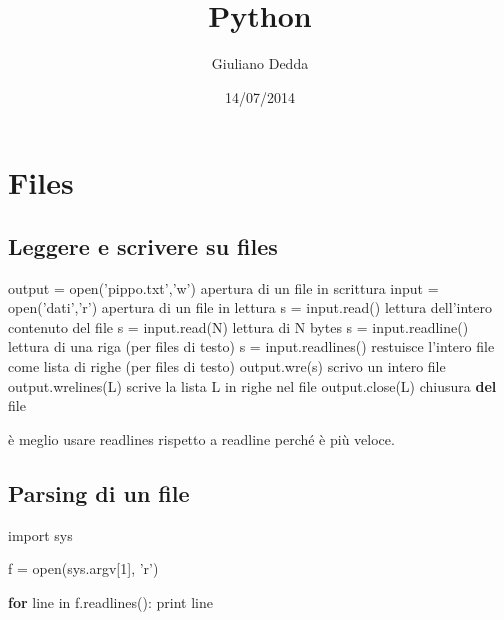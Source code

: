 \documentclass[]{article}
\title{Python}
\author{Giuliano Dedda}
\date{14/07/2014}
\newenvironment{Shaded}{}{}
\newcommand{\KeywordTok}[1]{\textcolor[rgb]{0.00,0.44,0.13}{\textbf{{#1}}}}
\newcommand{\DataTypeTok}[1]{\textcolor[rgb]{0.56,0.13,0.00}{{#1}}}
\newcommand{\DecValTok}[1]{\textcolor[rgb]{0.25,0.63,0.44}{{#1}}}
\newcommand{\CharTok}[1]{\textcolor[rgb]{0.25,0.44,0.63}{{#1}}}
\newcommand{\StringTok}[1]{\textcolor[rgb]{0.25,0.44,0.63}{{#1}}}
\newcommand{\NormalTok}[1]{{#1}}
\begin{document}
\maketitle

\section{Files}\label{files}

\subsection{Leggere e scrivere su
files}\label{leggere-e-scrivere-su-files}

\begin{Shaded}
\begin{Highlighting}[]
\NormalTok{output = }\DataTypeTok{open}\NormalTok{(}\StringTok{'pippo.txt'}\NormalTok{,}\StringTok{'w'}\NormalTok{)  apertura di un }\DataTypeTok{file} \NormalTok{in scrittura}
\DataTypeTok{input} \NormalTok{= }\DataTypeTok{open}\NormalTok{(}\StringTok{'dati'}\NormalTok{,}\StringTok{'r'}\NormalTok{)    apertura di un }\DataTypeTok{file} \NormalTok{in lettura}
\NormalTok{s = }\DataTypeTok{input}\NormalTok{.read()    lettura dell}\StringTok{'intero contenuto del file}
\StringTok{s = input.read(N)   lettura di N bytes}
\StringTok{s = input.readline()    lettura di una riga (per files di testo)}
\StringTok{s = input.readlines()   restuisce l'}\NormalTok{intero }\DataTypeTok{file} \NormalTok{come lista di righe (per files di testo)}
\NormalTok{output.wre(s)   scrivo un intero }\DataTypeTok{file}
\NormalTok{output.wrelines(L)  scrive la lista L in righe nel }\DataTypeTok{file}
\NormalTok{output.close(L) chiusura }\KeywordTok{del} \DataTypeTok{file}
\end{Highlighting}
\end{Shaded}

è meglio usare readlines rispetto a readline perché è più veloce.

\subsection{Parsing di un file}\label{parsing-di-un-file}

\begin{Shaded}
\begin{Highlighting}[]
\CharTok{import} \NormalTok{sys}

\NormalTok{f = }\DataTypeTok{open}\NormalTok{(sys.argv[}\DecValTok{1}\NormalTok{], }\StringTok{'r'}\NormalTok{)}

\KeywordTok{for} \NormalTok{line in f.readlines():}
    \DataTypeTok{print} \NormalTok{line}
\end{Highlighting}
\end{Shaded}
\end{document}

